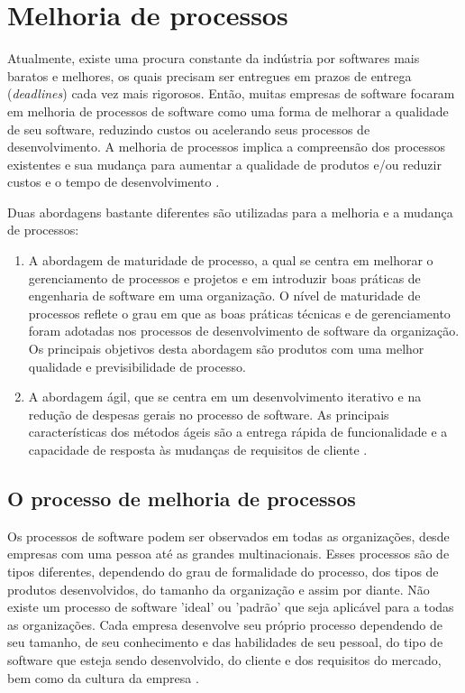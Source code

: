 \documentclass[12pt]{article}
\begin{document}
\section{Melhoria de processos}

 Atualmente, existe uma procura constante da indústria por softwares mais baratos e melhores, os quais precisam ser entregues em prazos de entrega (\textit{deadlines}) cada vez mais rigorosos. Então, muitas empresas de software focaram em melhoria de processos de software como uma forma de melhorar a qualidade de seu software, reduzindo custos ou acelerando seus processos de desenvolvimento. A melhoria de processos implica a compreensão dos processos existentes e sua mudança para aumentar a qualidade de produtos e/ou reduzir custos e o tempo de desenvolvimento  \cite{sommerville2007engenharia}.
 
 Duas abordagens bastante diferentes são utilizadas para a melhoria e a mudança de processos:
 \begin{enumerate}
     \item A abordagem de maturidade de processo, a qual se centra em melhorar o gerenciamento de processos e projetos e em introduzir boas práticas de engenharia de software em uma organização. O nível de maturidade de processos reflete o grau em que as boas práticas técnicas e de gerenciamento foram adotadas nos processos de desenvolvimento de software da organização. Os principais objetivos desta abordagem são produtos com uma melhor qualidade e previsibilidade de processo.
     \item A abordagem ágil, que se centra em um desenvolvimento iterativo e na redução de despesas gerais no processo de software. As principais características dos métodos ágeis são a entrega rápida de funcionalidade e a capacidade de resposta às mudanças de requisitos de cliente  \cite{sommerville2007engenharia}.
 \end{enumerate}

\subsection{O processo de melhoria  de processos}
Os processos de software podem ser observados em todas as organizações, desde empresas com uma pessoa até as grandes multinacionais. Esses processos são de tipos diferentes, dependendo do grau de formalidade do processo, dos tipos de produtos desenvolvidos, do tamanho da organização e assim por diante. Não existe um processo de software 'ideal' ou 'padrão' que seja aplicável para a todas as organizações. Cada empresa desenvolve seu próprio processo dependendo de seu tamanho, de seu conhecimento e das habilidades de seu pessoal, do tipo de software que esteja sendo desenvolvido, do cliente e dos requisitos do mercado, bem como da cultura da empresa \cite{sommerville2007engenharia}.
\end{document}
